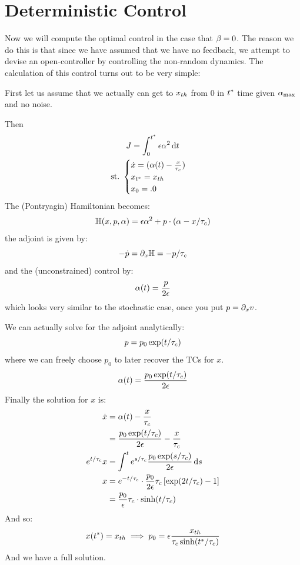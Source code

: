 \documentclass{article}
\begin{document}
\section{Deterministic Control}
\label{sec:deterministic_ode_control}
Now we will compute the optimal control in the case that ${\beta} = 0$. The reason we
do this is that since we have assumed that we have no feedback, we attempt to
devise an open-controller by controlling the non-random dynamics. The
calculation of this control turns out to be very simple:

First let us assume that we actually can get to ${ x_{th} }$ from $0$ in ${ t^* }$ time
given ${ {\alpha}_{\textrm{max}} }$ and no noise. 

Then 
\begin{equation}
\begin{gathered}
J = \int_0^{ t^* } {\epsilon} {\alpha}^2 \, \mathrm{d} t
\\
{ \textrm{st.\ } }
\begin{cases}
\dot{x} = ({\alpha}(t) - \frac{x}{{ \tau_{c} }})
\\
x_{ t^* } = { x_{th} }
\\
x_0 = .0
\end{cases} 
\end{gathered}
\end{equation}
The (Pontryagin) Hamiltonian becomes:
\begin{equation}
{ \mathbb{H}}(x,p, {\alpha}) = {\epsilon} {\alpha}^2 + p \cdot ({\alpha} - x/{ \tau_{c} } )
\end{equation}
the adjoint is given by:
\begin{equation}
-\dot{p} = {\partial}_x { \mathbb{H}} = - p / { \tau_{c} } 
\end{equation} 
and the (unconstrained) control by:
\begin{equation}
{\alpha}(t) = \frac p {2 {\epsilon}}
\end{equation}
which looks very similar to the stochastic case, once you put $p = {\partial}_x v$. 

We can actually solve for the adjoint analytically: 
$$
p = p_0 \exp(t / { \tau_{c} })
$$
where we can freely choose $p_0$ to later recover the TCs for $x$.
$$
{\alpha}(t) = \frac{p_0 \exp(t / { \tau_{c} })}{2{\epsilon}}
$$
Finally the solution for $x$ is:
\begin{align*}
\dot{x} & = {\alpha}(t) -  \frac{x}{{ \tau_{c} }}
\\ & = \frac{p_0 \exp(t / { \tau_{c} })}{2{\epsilon}} - \frac{x}{{ \tau_{c} }}
\\
e^{t/{ \tau_{c} }}x &= \int^t e^{s/{ \tau_{c} }}\frac{p_0 \exp(s / { \tau_{c} })}{2{\epsilon}} \, \mathrm{d} s
\\
x &= e^{-t/{ \tau_{c} }} \cdot \frac{p_0 }{2{\epsilon}} { \tau_{c} } \left[  \exp(2 t / { \tau_{c} }) -1 \right] 
\\
&= \frac{p_0 }{{\epsilon}} { \tau_{c} } \cdot  \sinh (t/ { \tau_{c} })
\end{align*}
And so: 
$$
x({ t^* }) = { x_{th} } \implies p_0 = {\epsilon} \frac{{ x_{th} }  }{ { \tau_{c} } \sinh ({ t^* }/ { \tau_{c} }) }
$$
And we have a full solution.
\end{document}
